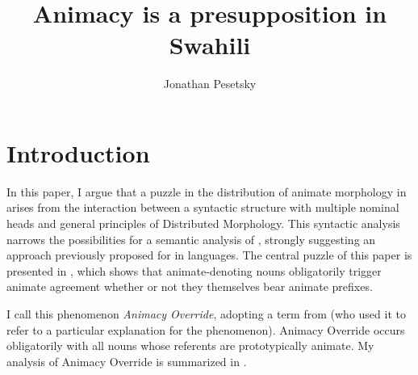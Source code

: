 \documentclass[output=paper
,newtxmath
,modfonts
,nonflat]{langsci/langscibook}
\author{Jonathan Pesetsky \affiliation{ILLC, University of Amsterdam} }
\title{Animacy is a presupposition in Swahili}
\begin{document}
\section{Introduction} \label{sec:pesetsky:introduction}
 
In this paper, I argue that a puzzle in the distribution of animate morphology in  arises from the interaction between a syntactic structure with multiple nominal heads and general principles of Distributed Morphology.  This syntactic analysis narrows the possibilities for a semantic analysis of , strongly suggesting an approach previously proposed for  in  languages. The central puzzle of this paper is presented in , which shows that  animate-denoting nouns obligatorily trigger animate agreement whether or not they themselves bear animate prefixes. 

 \ea\label{ex:pesetsky:kiongoziintro}
 
\z \z
 
I call this phenomenon \textit{Animacy Override}, adopting a term from \citet{carstens91} (who used it to refer to a particular explanation for the phenomenon).  Animacy Override occurs obligatorily with all nouns whose referents are prototypically animate.  My analysis of Animacy Override is summarized in .

 \ea\label{ex:pesetsky:theproposal}
 \z \z
\end{document}
